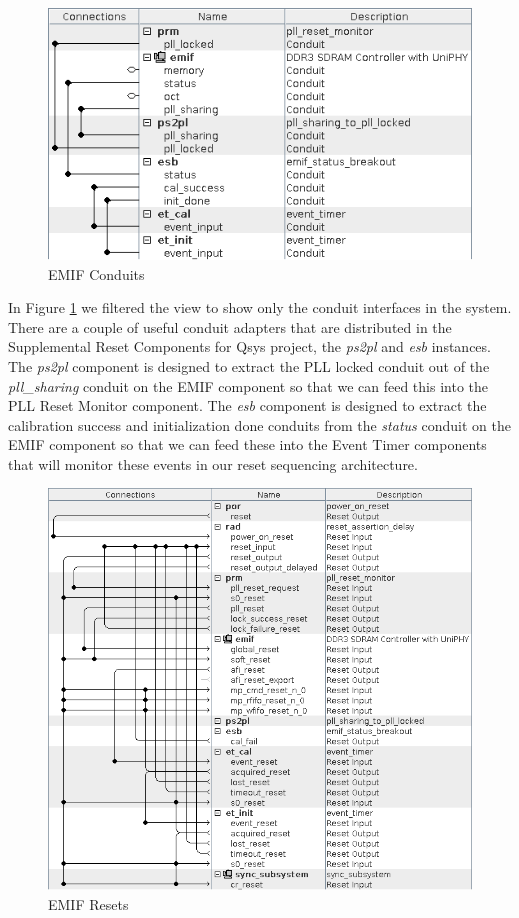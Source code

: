 \documentclass{article}
\begin{document}
\begin{flushleft}
\begin{figure}[H]
\centering
\includegraphics[scale=0.675]{emif_conduits}
\caption{EMIF Conduits}
\label{fig:emif_conduits}
\end{figure}

In Figure \ref{fig:emif_conduits} we filtered the view to show only the conduit interfaces in the system.  There are a couple of useful conduit adapters that are distributed in the Supplemental Reset Components for Qsys project, the \emph{ps2pl} and \emph{esb} instances.  The \emph{ps2pl} component is designed to extract the PLL locked conduit out of the \emph{pll\_sharing} conduit on the EMIF component so that we can feed this into the PLL Reset Monitor component.  The \emph{esb} component is designed to extract the calibration success and initialization done conduits from the \emph{status} conduit on the EMIF component so that we can feed these into the Event Timer components that will monitor these events in our reset sequencing architecture.

\begin{figure}[H]
\centering
\includegraphics[scale=0.675]{emif_resets}
\caption{EMIF Resets}
\label{fig:emif_resets}
\end{figure}


\end{flushleft}
\end{document}
